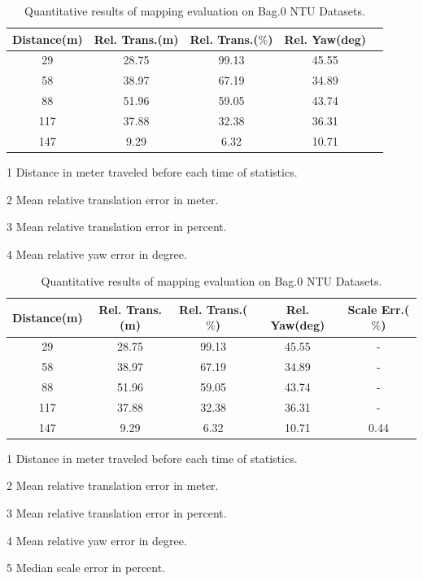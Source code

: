 \begin{table}
	\centering
	\caption{Quantitative results of mapping evaluation on Bag.0 NTU Datasets.}
	\begin{threeparttable}
		\begin{tabular}{|c|c|c|c|c|}
			\hline
			Distance(m)\tnote{1} & Rel. Trans.(m)\tnote{2}  & Rel. Trans.($\%$)\tnote{3} & Rel. Yaw(deg)\tnote{4} \\
			\hline
			29& 28.75 & 99.13 & 45.55 \\
			\hline
			58&38.97& 67.19 & 34.89 \\
			\hline
			88&51.96& 59.05 & 43.74  \\
			\hline
			117&37.88&32.38 & 36.31  \\
			\hline
			147&9.29& 6.32 & 10.71 \\
			\hline
		\end{tabular}
		\begin{tablenotes}
			\footnotesize
			\item[1] Distance in meter traveled before each time of statistics. 
			\item[2] Mean relative translation error in meter.
			\item[3] Mean relative translation error in percent.
			\item[4] Mean relative yaw error in degree.
		\end{tablenotes}
	
	\ifoutputscaleerror
			\begin{tabular}{|c|c|c|c|c|}
		\hline
		Distance(m)\tnote{1} & Rel. Trans.(m)\tnote{2}  & Rel. Trans.($\%$)\tnote{3} & Rel. Yaw(deg)\tnote{4} & Scale Err.($\%$)\tnote{5}  \\
		\hline
		29& 28.75 & 99.13 & 45.55& - \\
		\hline
		58&38.97& 67.19 & 34.89 & - \\
		\hline
		88&51.96& 59.05 & 43.74 & - \\
		\hline
		117&37.88&32.38 & 36.31 & - \\
		\hline
		147&9.29& 6.32 & 10.71 & 0.44\\
		\hline
	\end{tabular}
	\begin{tablenotes}
		\footnotesize
		\item[1] Distance in meter traveled before each time of statistics. 
		\item[2] Mean relative translation error in meter.
		\item[3] Mean relative translation error in percent.
		\item[4] Mean relative yaw error in degree.
		\item[5] Median scale error in percent.
	\end{tablenotes}
	\fi

	\end{threeparttable}
	\label{tbl:ntubag0quanresult}
\end{table}

